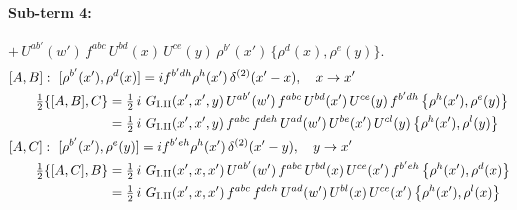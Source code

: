 \documentclass[10pt]{article}
\numberwithin{equation}{section}
\begin{document}
\paragraph{Sub-term 4:} $+\,U^{ab'}(w')\,f^{abc}\,U^{bd}(x)\,U^{ce}(y)\,\rho^{b'}(x')\,\big\{\rho^{d}(x),\rho^{e}(y)\big\}$.
\begin{align}
&[A,B]:\ [\rho^{b'}(x'),\rho^{d}(x)]=i f^{b'dh}\rho^{h}(x')\,\delta^{(2)}(x'-x),\quad x\to x'\notag\\
&\qquad \tfrac12\{[A,B],C\}=\tfrac12\,i\,\,G_{\rm I.II}(x',x',y)\,U^{ab'}(w')\,f^{abc}\,U^{bd}(x')\,U^{ce}(y)\,f^{b'dh}\,\big\{\rho^{h}(x'),\rho^{e}(y)\big\}\notag\\
&\qquad\phantom{\tfrac12\{[A,B],C\}}=\tfrac12\,i\,\,G_{\rm I.II}(x',x',y)\,f^{abc}\,f^{deh}\,U^{ad}(w')\,U^{be}(x')\,U^{cl}(y)\,\big\{\rho^{h}(x'),\rho^{l}(y)\big\}
\label{R:eq:GI.II-4-AB}\\
&[A,C]:\ [\rho^{b'}(x'),\rho^{e}(y)]=i f^{b'eh}\rho^{h}(x')\,\delta^{(2)}(x'-y),\quad y\to x'\notag\\
&\qquad \tfrac12\{[A,C],B\}=\tfrac12\,i\,\,G_{\rm I.II}(x',x,x')\,U^{ab'}(w')\,f^{abc}\,U^{bd}(x)\,U^{ce}(x')\,f^{b'eh}\,\big\{\rho^{h}(x'),\rho^{d}(x)\big\}\notag\\
&\qquad\phantom{\tfrac12\{[A,C],B\}}=\tfrac12\,i\,\,G_{\rm I.II}(x',x,x')\,f^{abc}\,f^{deh}\,U^{ad}(w')\,U^{bl}(x)\,U^{ce}(x')\,\big\{\rho^{h}(x'),\rho^{l}(x)\big\}
\label{R:eq:GI.II-4-AC}
\end{align}
\end{document}
